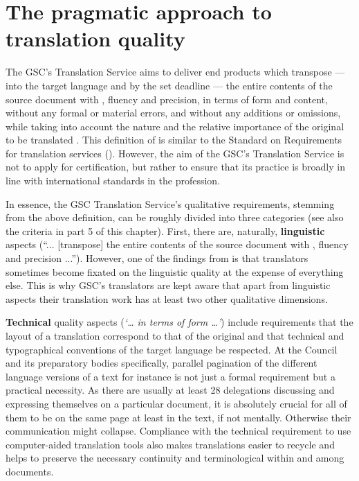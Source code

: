 \documentclass[output=paper]{langsci/langscibook}
\begin{document}
\clearpage
\section{The pragmatic approach to translation quality}\label{sec:hanzl:hanzl:2}

The GSC's Translation Service aims to deliver end products which transpose — into the target language and by the set deadline — the entire contents of the source document with , fluency and precision, in terms of form and content, without any formal or material errors, and without any additions or omissions, while taking into account the nature and the relative importance of the original to be translated \citep[4]{Council2006}. This definition of  is similar to the  Standard  on Requirements for translation services (\citeyear{ISO2015}). However, the aim of the GSC's Translation Service is not to apply for  certification, but rather to ensure that its practice is broadly in line with international standards in the profession.

In essence, the GSC Translation Service's qualitative requirements, stemming from the above definition, can be roughly divided into three categories (see also the  criteria in part 5 of this chapter). First, there are, naturally, \textbf{linguistic} aspects (“... [transpose] the entire contents of the source document with , fluency and precision ...”). However, one of the findings from  is that translators sometimes become fixated on the linguistic quality at the expense of everything else. This is why GSC's translators are kept aware that apart from linguistic aspects their translation work has at least two other qualitative dimensions. 

\textbf{Technical} quality aspects (\textit{‘… in terms of form …’}) include requirements that the layout of a translation correspond to that of the original and that technical and typographical conventions of the target language be respected. At the Council and its preparatory bodies specifically, parallel pagination of the different language versions of a text for instance is not just a formal requirement but a practical necessity. As there are usually at least 28 delegations discussing and expressing themselves on a particular document, it is absolutely crucial for all of them to be on the same page at least in the text, if not mentally. Otherwise their communication might collapse. Compliance with the technical requirement to use computer-aided translation tools also makes translations easier to recycle and helps to preserve the necessary continuity and terminological  within and among documents.
\end{document}
